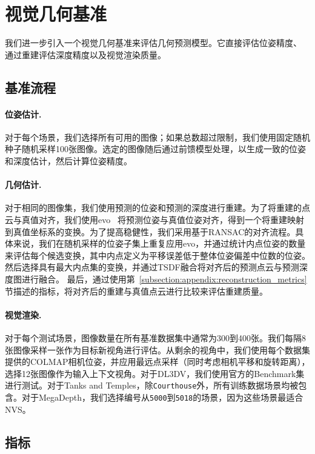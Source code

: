 
\section{视觉几何基准}

我们进一步引入一个视觉几何基准来评估几何预测模型。它直接评估位姿精度、
通过重建评估深度精度以及视觉渲染质量。

\subsection{基准流程}

\paragraph{位姿估计.}
对于每个场景，我们选择所有可用的图像；如果总数超过限制，我们使用固定随机种子随机采样100张图像。选定的图像随后通过前馈模型处理，以生成一致的位姿和深度估计，然后计算位姿精度。

\paragraph{几何估计.} 对于相同的图像集，我们使用预测的位姿和预测的深度进行重建。为了将重建的点云与真值对齐，我们使用evo~\citep{umeyama2002least} 将预测位姿与真值位姿对齐，得到一个将重建映射到真值坐标系的变换。为了提高稳健性，我们采用基于RANSAC的对齐流程。具体来说，我们在随机采样的位姿子集上重复应用evo，并通过统计内点位姿的数量来评估每个候选变换，其中内点定义为平移误差低于整体位姿偏差中位数的位姿。然后选择具有最大内点集的变换，并通过TSDF融合将对齐后的预测点云与预测深度图进行融合。
最后，通过使用第~\ref{subsection:appendix:reconstruction_metrics} 节描述的指标，将对齐后的重建与真值点云进行比较来评估重建质量。

\paragraph{视觉渲染.}
对于每个测试场景，图像数量在所有基准数据集中通常为300到400张。我们每隔8张图像采样一张作为目标新视角进行评估。从剩余的视角中，我们使用每个数据集提供的COLMAP相机位姿，并应用最远点采样（同时考虑相机平移和旋转距离），选择12张图像作为输入上下文视角。对于DL3DV，我们使用官方的Benchmark集进行测试。对于Tanks and Temples，除\texttt{Courthouse}外，所有训练数据场景均被包含。对于MegaDepth，我们选择编号从\texttt{5000}到\texttt{5018}的场景，因为这些场景最适合NVS。

\subsection{指标}

